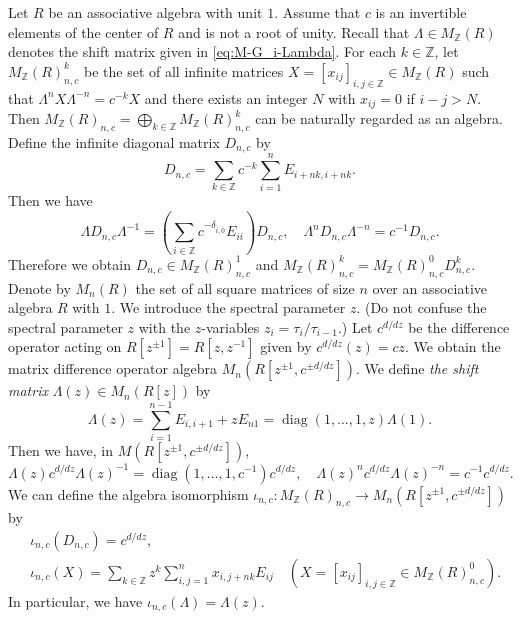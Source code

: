 \documentclass[12pt,twoside]{article}
\newcommand\diag{\mathop{\mathrm{diag}}\nolimits}
\newcommand\Z{{\mathbb Z}} %
\theoremstyle{plain} %
\theoremstyle{definition} %
\theoremstyle{definition} %
\numberwithin{theorem}{section}
\numberwithin{equation}{section}
\numberwithin{figure}{section}
\numberwithin{table}{section}
\begin{document}
Let $R$ be an associative algebra with unit $1$.
Assume that $c$ is an invertible elements of the center of $R$
and is not a root of unity.
Recall that $\Lambda\in M_\Z(R)$ denotes 
the shift matrix given in \eqref{eq:M-G_i-Lambda}.
For each $k\in\Z$, let $M_\Z(R)_{n,c}^k$ be the set of 
all infinite matrices $X=[x_{ij}]_{i,j\in\Z}\in M_\Z(R)$ such that
$\Lambda^n X \Lambda^{-n}=c^{-k} X$ and
there exists an integer $N$ with $x_{ij}=0$ if $i-j>N$.
Then $M_\Z(R)_{n,c} = \bigoplus_{k\in\Z}M_\Z(R)_{n,c}^k$ can be 
naturally regarded as an algebra.
Define the infinite diagonal matrix $D_{n,c}$ by 
\begin{equation*}
 D_{n,c} = \sum_{k\in\Z} c^{-k} \sum_{i=1}^n E_{i+nk,i+nk}.
\end{equation*}
Then we have
\begin{equation*}
 \Lambda D_{n,c} \Lambda^{-1} =  
 \left(
  \sum_{i\in\Z} c^{-\delta_{\overline{i},\overline{0}}} E_{ii}
 \right) D_{n,c},
 \quad
 \Lambda^n D_{n,c} \Lambda^{-n} = c^{-1} D_{n,c}.
\end{equation*}
Therefore we obtain $D_{n,c}\in M_\Z(R)_{n,c}^1$ 
and $M_\Z(R)_{n,c}^k = M_\Z(R)_{n,c}^0 D_{n,c}^k$.
%
Denote by $M_n(R)$ the set of all square matrices of size $n$ 
over an associative algebra $R$ with $1$.
We introduce the spectral parameter $z$.
(Do not confuse the spectral parameter $z$ 
with the $z$-variables $z_i=\tau_i/\tau_{i-1}$.)
Let $c^{d/dz}$ be the difference operator acting 
on $R[z^{\pm1}]=R[z,z^{-1}]$ given by $c^{d/dz}(z)=cz$.
We obtain the matrix difference operator algebra 
$M_n(R[z^{\pm1},c^{\pm d/dz}])$.
We define {\em the shift matrix} $\Lambda(z)\in M_n(R[z])$ by
\begin{equation*}
 \Lambda(z) 
 = \sum_{i=1}^{n-1} E_{i,i+1} + z E_{n1}
 = \diag(1,\ldots,1,z) \Lambda(1).
\end{equation*}
Then we have, in $M(R[z^{\pm1},c^{\pm d/dz}])$, 
\begin{equation*}
 \Lambda(z) c^{d/dz} \Lambda(z)^{-1} = \diag(1,\ldots,1,c^{-1})c^{d/dz}, \quad
 \Lambda(z)^n c^{d/dz} \Lambda(z)^{-n} = c^{-1} c^{d/dz}.
\end{equation*}
We can define the algebra isomorphism 
$\iota_{n,c} : M_\Z(R)_{n,c}\to M_n(R[z^{\pm1},c^{\pm d/dz}])$ by
\begin{align*}
 &
 \iota_{n,c}(D_{n,c}) = c^{d/dz}, \quad
 \\ &
 \iota_{n,c}(X) 
 = \sum_{k\in\Z} z^k \sum_{i,j=1}^n x_{i,j+nk} E_{ij}
 \quad (X=[x_{ij}]_{i,j\in\Z}\in M_\Z(R)_{n,c}^0).
\end{align*}
In particular, we have $\iota_{n,c}(\Lambda)=\Lambda(z)$.
\end{document}
